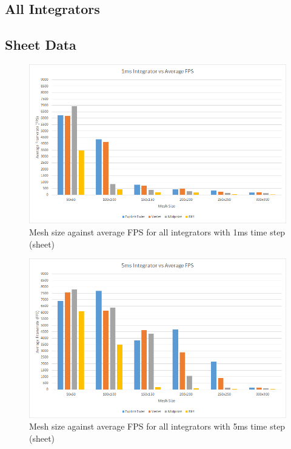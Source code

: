 \begin{landscape}

\section{All Integrators}

\subsection{Sheet Data}

    \begin{figure}[!htb]
    \begin{center}
      \includegraphics{Figures/sheet_1ms_int_fps}
    \end{center}
    \caption{Mesh size against average FPS for all integrators with 1ms time step (sheet)}
    \label{fig:1ms fps sheet}
  \end{figure}
  
    \begin{figure}[!htb]
    \begin{center}
      \includegraphics{Figures/sheet_5ms_int_fps}
    \end{center}
    \caption{Mesh size against average FPS for all integrators with 5ms time step (sheet)}
    \label{fig:5ms fps sheet}
  \end{figure}
  

\end{landscape}
